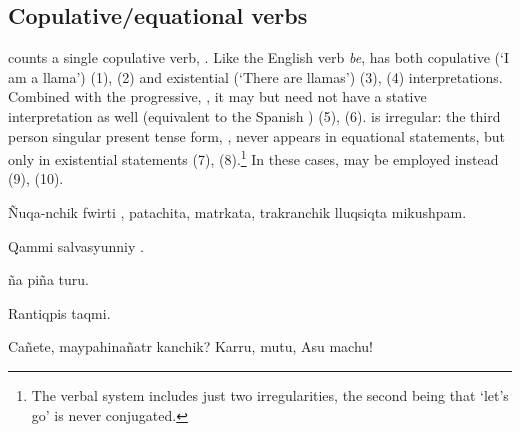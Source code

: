 \subsection{Copulative/equational verbs}\label{ssec:copu}
\SYQ{} counts a single copulative verb, . Like the English verb \emph{be},  has both copulative (`I am a llama') (1), (2) and existential (`There are llamas') (3), (4) interpretations. Combined with the progressive, , it may but need not have a stative interpretation as well (equivalent to the Spanish ) (5), (6).  is irregular: the third person singular present tense form, , never appears in equational statements, but only in existential statements (7), (8).\footnote{The verbal system includes just two irregularities, the second being that  `let's go' is never conjugated.} In these cases,  may be employed instead (9), (10).

%
{\~Nuqa-nchik fwirti , patachita, matrkata, trakranchik lluqsiqta mikushpam.}%
{}%
{}{}%

%
{Qammi salvasyunniy .}%
{}%
{}{}%

%
{\~na pi\~na turu.}%
{}%
{}{}%

%
{Rantiqpis taqmi.}%
{}%
{}{}%

%
{\textquestiondown{}Ca\~nete, maypahina\~natr kanchik? Karru, mutu,  \textexclamdown{}Asu machu!}%
{}%
{}{}%

